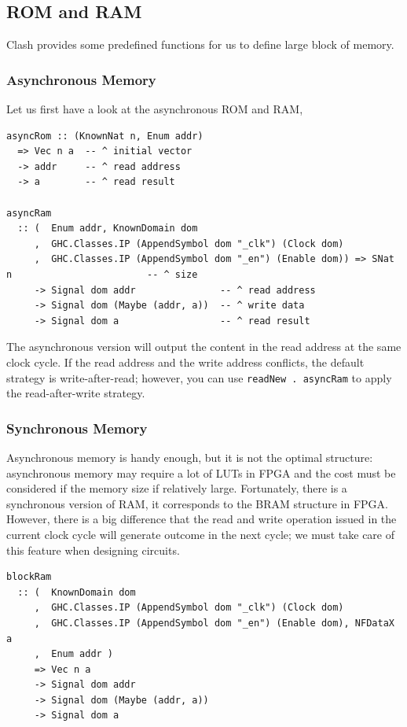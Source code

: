 \documentclass[a4paper,12pt, oneside]{book}
\begin{document}
\subsection{ROM and RAM}
Clash provides some predefined functions for us to define large block of memory. 
\subsubsection{Asynchronous Memory}
Let us first have a look at the asynchronous ROM and RAM,
\begin{verbatim}
asyncRom :: (KnownNat n, Enum addr) 
  => Vec n a  -- ^ initial vector 
  -> addr     -- ^ read address
  -> a        -- ^ read result         

asyncRam
  :: (  Enum addr, KnownDomain dom
     ,  GHC.Classes.IP (AppendSymbol dom "_clk") (Clock dom)
     ,  GHC.Classes.IP (AppendSymbol dom "_en") (Enable dom)) => SNat n                        -- ^ size
     -> Signal dom addr               -- ^ read address
     -> Signal dom (Maybe (addr, a))  -- ^ write data
     -> Signal dom a                  -- ^ read result
\end{verbatim}
The asynchronous version will output the content in the read address at the same clock cycle. If the read address and the write address conflicts, the default strategy is write-after-read; however, you can use \texttt{readNew . asyncRam} to apply the read-after-write strategy.

\subsubsection{Synchronous Memory}
Asynchronous memory is handy enough, but it is not the optimal structure: asynchronous memory may require a lot of LUTs in FPGA and the cost must be considered if the memory size if relatively large. Fortunately, there is a synchronous version of RAM, it corresponds to the BRAM structure in FPGA. However, there is a big difference that the read and write operation issued in the current clock cycle will generate outcome in the next cycle; we must take care of this feature when designing circuits.
\begin{verbatim}
blockRam
  :: (  KnownDomain dom
     ,  GHC.Classes.IP (AppendSymbol dom "_clk") (Clock dom)
     ,  GHC.Classes.IP (AppendSymbol dom "_en") (Enable dom), NFDataX a
     ,  Enum addr ) 
     => Vec n a
     -> Signal dom addr 
     -> Signal dom (Maybe (addr, a)) 
     -> Signal dom a
\end{verbatim}
\end{document}
